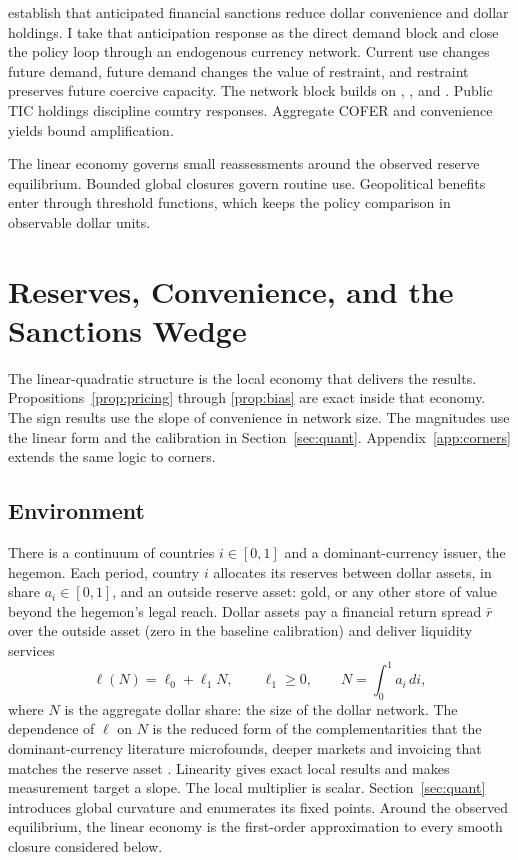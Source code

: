 \documentclass[11pt]{article}
\theoremstyle{definition}
\begin{document}
\citet{BianchiSosaPadilla2025EJ} establish that anticipated financial sanctions reduce dollar convenience and dollar holdings. I take that anticipation response as the direct demand block and close the policy loop through an endogenous currency network. Current use changes future demand, future demand changes the value of restraint, and restraint preserves future coercive capacity. The network block builds on \citet{GopinathStein2021}, \citet{FarhiMaggiori2018}, and \citet{HeKrishnamurthyMilbradt2019}. Public TIC holdings discipline country responses. Aggregate COFER and convenience yields bound amplification.

The linear economy governs small reassessments around the observed reserve equilibrium. Bounded global closures govern routine use. Geopolitical benefits enter through threshold functions, which keeps the policy comparison in observable dollar units.


\section{Reserves, Convenience, and the Sanctions Wedge}\label{sec:static}

The linear-quadratic structure is the local economy that delivers the results. Propositions~\ref{prop:pricing} through \ref{prop:bias} are exact inside that economy. The sign results use the slope of convenience in network size. The magnitudes use the linear form and the calibration in Section~\ref{sec:quant}. Appendix~\ref{app:corners} extends the same logic to corners.

\subsection{Environment}

There is a continuum of countries $i \in [0,1]$ and a dominant-currency issuer, the hegemon. Each period, country $i$ allocates its reserves between dollar assets, in share $a_i \in [0,1]$, and an outside reserve asset: gold, or any other store of value beyond the hegemon's legal reach. Dollar assets pay a financial return spread $\bar r$ over the outside asset (zero in the baseline calibration) and deliver liquidity services
\begin{equation}
\ell(N) = \ell_0 + \ell_1 N, \qquad \ell_1 \ge 0, \qquad N = \int_0^1 a_i \, di,
\label{eq:ell}
\end{equation}
where $N$ is the aggregate dollar share: the size of the dollar network. The dependence of $\ell$ on $N$ is the reduced form of the complementarities that the dominant-currency literature microfounds, deeper markets and invoicing that matches the reserve asset \citep{GopinathStein2021, FarhiMaggiori2018, HeKrishnamurthyMilbradt2019}. Linearity gives exact local results and makes measurement target a slope. The local multiplier is scalar. Section~\ref{sec:quant} introduces global curvature and enumerates its fixed points. Around the observed equilibrium, the linear economy is the first-order approximation to every smooth closure considered below.
\end{document}
